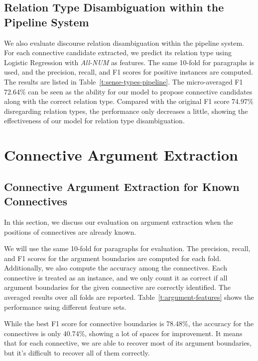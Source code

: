 

\subsection{Relation Type Disambiguation within the Pipeline System}

We also evaluate discourse relation disambiguation within the pipeline system.
For each connective candidate extracted, we predict its relation type using
Logistic Regression with \textit{All-NUM} as features.
The same 10-fold for paragraphs is used, and the precision, recall, and F1 scores
for positive instances are computed. The results are listed in
Table~\ref{t:sense-types-pipeline}. The micro-averaged F1 72.64\% can be seen
as the ability for our model to propose connective candidates along with the correct
relation type. Compared with the original F1 score 74.97\% disregarding relation types,
the performance only decreases a little, showing the effectiveness of our
model for relation type disambiguation.



\section{Connective Argument Extraction}

\subsection{Connective Argument Extraction for Known Connectives}

In this section, we discuss our evaluation on argument extraction when the
positions of connectives are already known.

We will use the same 10-fold for paragraphs for evaluation.
The precision, recall, and F1 scores for the argument boundaries are
computed for each fold. Additionally, we also compute the accuracy among the 
connectives. Each connective is treated as an instance, and we only count it
as correct if all argument boundaries for the given connective are correctly identified.
The averaged results over all folds are reported. Table~\ref{t:argument-features} shows
the performance using different feature sets.

While the best F1 score for connective boundaries is 78.48\%, the accuracy for
the connectives is only 40.74\%, showing a lot of spaces for
improvement. It means that for each connective, we are able to recover most of its
argument boundaries, but it's difficult to recover all of them correctly.

